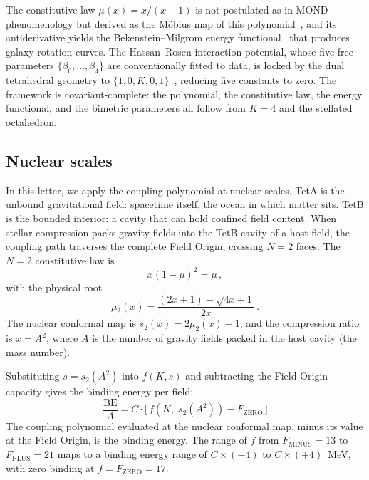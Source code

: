 \documentclass[twocolumn]{iopjournal}
\newcommand{\FZERO}{F_{\mathrm{ZERO}}}
\newcommand{\FPLUS}{F_{\mathrm{PLUS}}}
\newcommand{\FMINUS}{F_{\mathrm{MINUS}}}
\begin{document}
The constitutive law $\mu(x) = x/(x{+}1)$ is not postulated
as in MOND phenomenology but derived as the M\"obius map of this
polynomial~\cite{nelson2025a}, and its antiderivative yields the
Bekenstein--Milgrom energy functional~\cite{bekenstein1984} that
produces galaxy rotation curves.
The Hassan--Rosen interaction potential, whose five free
parameters $\{\beta_0,\ldots,\beta_4\}$ are conventionally
fitted to data, is locked by the dual tetrahedral geometry to
$\{1, 0, K, 0, 1\}$~\cite{nelson2025a}, reducing five constants
to zero.
The framework is covariant-complete: the polynomial, the
constitutive law, the energy functional, and the bimetric
parameters all follow from $K = 4$ and the stellated octahedron.

\subsection*{Nuclear scales}

In this letter, we apply the coupling polynomial at nuclear
scales. TetA is the unbound gravitational field: spacetime
itself, the ocean in which matter sits. TetB is the bounded
interior: a cavity that can hold confined field content.
When stellar compression packs gravity fields into the TetB
cavity of a host field, the coupling path traverses the
complete Field Origin, crossing $N = 2$ faces.
The $N = 2$ constitutive law is
\begin{equation}
  x(1 - \mu)^2 = \mu\,,
  \label{eq:n2}
\end{equation}
with the physical root
\begin{equation}
  \mu_2(x) = \frac{(2x + 1) - \sqrt{4x + 1}}{2x}\,.
  \label{eq:mu2}
\end{equation}
The nuclear conformal map is $s_2(x) = 2\mu_2(x) - 1$,
and the compression ratio is $x = A^2$, where $A$ is the number
of gravity fields packed in the host cavity (the mass number).

Substituting $s = s_2(A^2)$ into $f(K, s)$ and subtracting the
Field Origin capacity gives the binding energy per field:
\begin{equation}
  \boxed{\;
    \frac{\mathrm{BE}}{A} = C \cdot \bigl[\,f\!\left(K,\; s_2(A^2)\right)
    - \FZERO\,\bigr]
  \;}
  \label{eq:binding}
\end{equation}
The coupling polynomial evaluated at the nuclear conformal map,
minus its value at the Field Origin, is the binding energy.
The range of $f$ from $\FMINUS = 13$ to $\FPLUS = 21$ maps to a
binding energy range of $C \times ({-}4)$ to $C \times (+4)$~MeV,
with zero binding at $f = \FZERO = 17$.
\end{document}
